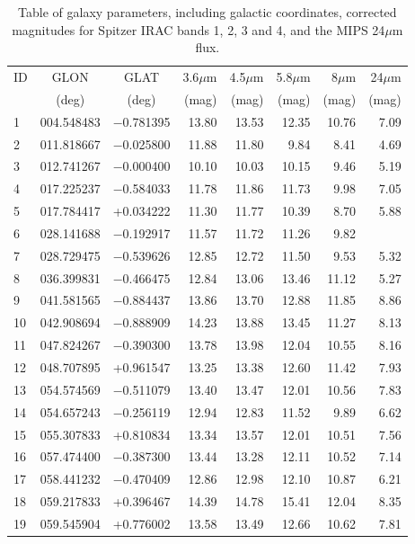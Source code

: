 \documentclass[times,usenatbib]{mn2e}
\begin{document}
\begin{table}
\begin{center}
\caption{Table of galaxy parameters, including galactic coordinates, corrected magnitudes for Spitzer IRAC bands 1, 2, 3 and 4, and the MIPS 24$\mu$m flux.}
\begin{tabular}{lccrrrrr}
\hline
ID & GLON & GLAT & 3.6$\mu$m & 4.5$\mu$m & 5.8$\mu$m & 8$\mu$m & 24$\mu$m \\
 & (deg) & (deg) & (mag) & (mag) & (mag) & (mag) & (mag) \\
\hline
 1 & 004.548483 & $-$0.781395 & 13.80 & 13.53 & 12.35 & 10.76 & 7.09 \\
 2 & 011.818667 & $-$0.025800 & 11.88 & 11.80 & 9.84 & 8.41 & 4.69 \\
 3 & 012.741267 & $-$0.000400 & 10.10 & 10.03 & 10.15 & 9.46 & 5.19 \\
 4 & 017.225237 & $-$0.584033 & 11.78 & 11.86 & 11.73 & 9.98 & 7.05 \\
 5 & 017.784417 & +0.034222 & 11.30 & 11.77 & 10.39 & 8.70 & 5.88 \\
 6 & 028.141688 & $-$0.192917 & 11.57 & 11.72 & 11.26 & 9.82 &  \\
 7 & 028.729475 & $-$0.539626 & 12.85 & 12.72 & 11.50 & 9.53 & 5.32 \\
 8 & 036.399831 & $-$0.466475 & 12.84 & 13.06 & 13.46 & 11.12 & 5.27 \\
 9 & 041.581565 & $-$0.884437 & 13.86 & 13.70 & 12.88 & 11.85 & 8.86 \\
10 & 042.908694 & $-$0.888909 & 14.23 & 13.88 & 13.45 & 11.27 & 8.13 \\
11 & 047.824267 & $-$0.390300 & 13.78 & 13.98 & 12.04 & 10.55 & 8.16 \\
12 & 048.707895 & +0.961547 & 13.25 & 13.38 & 12.60 & 11.42 & 7.93 \\
13 & 054.574569 & $-$0.511079 & 13.40 & 13.47 & 12.01 & 10.56 & 7.83 \\
14 & 054.657243 & $-$0.256119 & 12.94 & 12.83 & 11.52 & 9.89 & 6.62 \\
15 & 055.307833 & +0.810834 & 13.34 & 13.57 & 12.01 & 10.51 & 7.56 \\
16 & 057.474400 & $-$0.387300 & 13.44 & 13.28 & 12.11 & 10.52 & 7.14 \\
17 & 058.441232 & $-$0.470409 & 12.86 & 12.98 & 12.10 & 10.87 & 6.21 \\
18 & 059.217833 & +0.396467 & 14.39 & 14.78 & 15.41 & 12.04 & 8.35 \\
19 & 059.545904 & +0.776002 & 13.58 & 13.49 & 12.66 & 10.62 & 7.81 \\

\end{tabular}
\end{center}
\end{table}
\end{document}

